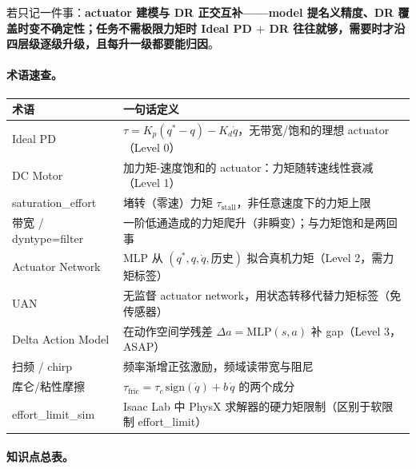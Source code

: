 若只记一件事：\textbf{actuator 建模与 DR 正交互补——model 提名义精度、DR 覆盖时变不确定性；任务不需极限力矩时 Ideal PD $+$ DR 往往就够，需要时才沿四层级逐级升级，且每升一级都要能归因}。

\paragraph{术语速查。}

\begin{center}
\small
\begin{tabular}{@{}lp{9.5cm}@{}}
\toprule
术语 & 一句话定义 \\
\midrule
Ideal PD & $\tau=K_p(q^*-q)-K_d\dot q$，无带宽/饱和的理想 actuator（Level 0） \\
DC Motor & 加力矩-速度饱和的 actuator：力矩随转速线性衰减（Level 1） \\
saturation\_effort & 堵转（零速）力矩 $\tau_{\mathrm{stall}}$，非任意速度下的力矩上限 \\
带宽 / dyntype=filter & 一阶低通造成的力矩爬升（非瞬变）；与力矩饱和是两回事 \\
Actuator Network & MLP 从 $(q^*,q,\dot q,\text{历史})$ 拟合真机力矩（Level 2，需力矩标签） \\
UAN & 无监督 actuator network，用状态转移代替力矩标签（免传感器） \\
Delta Action Model & 在动作空间学残差 $\Delta a=\mathrm{MLP}(s,a)$ 补 gap（Level 3，ASAP） \\
扫频 / chirp & 频率渐增正弦激励，频域读带宽与阻尼 \\
库仑/粘性摩擦 & $\tau_{\text{fric}}=\tau_c\,\mathrm{sign}(\dot q)+b\,\dot q$ 的两个成分 \\
effort\_limit\_sim & Isaac Lab 中 PhysX 求解器的硬力矩限制（区别于软限制 effort\_limit） \\
\bottomrule
\end{tabular}
\end{center}

\paragraph{知识点总表。}

